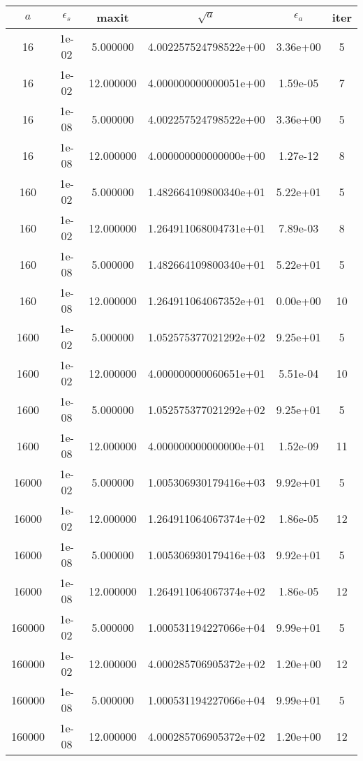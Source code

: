 
\begin{tabular}{|ccc|ccc|}\hline 
$a$ & $\epsilon_s$ & maxit & $\sqrt{a}$ & $\epsilon_a$ & iter\\ \hline 
16 & 1e-02 & 5.000000 & 4.002257524798522e+00 & 3.36e+00 &  5\\
16 & 1e-02 & 12.000000 & 4.000000000000051e+00 & 1.59e-05 &  7\\
16 & 1e-08 & 5.000000 & 4.002257524798522e+00 & 3.36e+00 &  5\\
16 & 1e-08 & 12.000000 & 4.000000000000000e+00 & 1.27e-12 &  8\\\hline 
160 & 1e-02 & 5.000000 & 1.482664109800340e+01 & 5.22e+01 &  5\\
160 & 1e-02 & 12.000000 & 1.264911068004731e+01 & 7.89e-03 &  8\\
160 & 1e-08 & 5.000000 & 1.482664109800340e+01 & 5.22e+01 &  5\\
160 & 1e-08 & 12.000000 & 1.264911064067352e+01 & 0.00e+00 & 10\\\hline 
1600 & 1e-02 & 5.000000 & 1.052575377021292e+02 & 9.25e+01 &  5\\
1600 & 1e-02 & 12.000000 & 4.000000000060651e+01 & 5.51e-04 & 10\\
1600 & 1e-08 & 5.000000 & 1.052575377021292e+02 & 9.25e+01 &  5\\
1600 & 1e-08 & 12.000000 & 4.000000000000000e+01 & 1.52e-09 & 11\\\hline 
16000 & 1e-02 & 5.000000 & 1.005306930179416e+03 & 9.92e+01 &  5\\
16000 & 1e-02 & 12.000000 & 1.264911064067374e+02 & 1.86e-05 & 12\\
16000 & 1e-08 & 5.000000 & 1.005306930179416e+03 & 9.92e+01 &  5\\
16000 & 1e-08 & 12.000000 & 1.264911064067374e+02 & 1.86e-05 & 12\\\hline 
160000 & 1e-02 & 5.000000 & 1.000531194227066e+04 & 9.99e+01 &  5\\
160000 & 1e-02 & 12.000000 & 4.000285706905372e+02 & 1.20e+00 & 12\\
160000 & 1e-08 & 5.000000 & 1.000531194227066e+04 & 9.99e+01 &  5\\
160000 & 1e-08 & 12.000000 & 4.000285706905372e+02 & 1.20e+00 & 12\\\hline 
\end{tabular}
